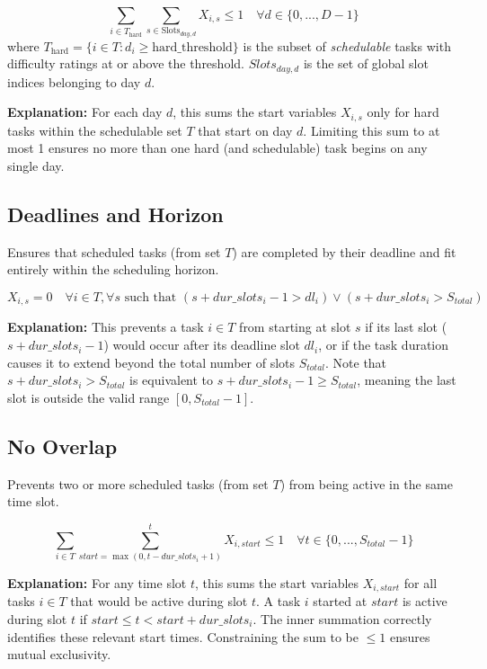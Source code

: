 \documentclass{article}
\begin{document}
\[
\sum_{i \in T_{\text{hard}}} \sum_{s \in \text{Slots}_{day,d}} X_{i,s} \leq 1 \quad \forall d \in \{0, ..., D-1\}
\]
where $T_{\text{hard}} = \{i \in T : d_i \geq \text{hard\_threshold}\}$ is the subset of \textit{schedulable} tasks with difficulty ratings at or above the threshold. $Slots_{day,d}$ is the set of global slot indices belonging to day $d$.

\textbf{Explanation:} For each day $d$, this sums the start variables $X_{i,s}$ only for hard tasks within the schedulable set $T$ that start on day $d$. Limiting this sum to at most 1 ensures no more than one hard (and schedulable) task begins on any single day.

\subsection{Deadlines and Horizon}
Ensures that scheduled tasks (from set $T$) are completed by their deadline and fit entirely within the scheduling horizon.

\[
X_{i,s} = 0 \quad \forall i \in T, \forall s \text{ such that } (s + dur\_slots_i - 1 > dl_i) \lor (s + dur\_slots_i > S_{total})
\]

\textbf{Explanation:} This prevents a task $i \in T$ from starting at slot $s$ if its last slot ($s + dur\_slots_i - 1$) would occur after its deadline slot $dl_i$, or if the task duration causes it to extend beyond the total number of slots $S_{total}$. Note that $s + dur\_slots_i > S_{total}$ is equivalent to $s + dur\_slots_i - 1 \ge S_{total}$, meaning the last slot is outside the valid range $[0, S_{total}-1]$.

\subsection{No Overlap}
Prevents two or more scheduled tasks (from set $T$) from being active in the same time slot.

\[
\sum_{i \in T} \sum_{start = \max(0, t - dur\_slots_i + 1)}^{t} X_{i,start} \le 1 \quad \forall t \in \{0, ..., S_{total}-1\}
\]

\textbf{Explanation:} For any time slot $t$, this sums the start variables $X_{i,start}$ for all tasks $i \in T$ that would be active during slot $t$. A task $i$ started at $start$ is active during slot $t$ if $start \le t < start + dur\_slots_i$. The inner summation correctly identifies these relevant start times. Constraining the sum to be $\le 1$ ensures mutual exclusivity.
\end{document}
